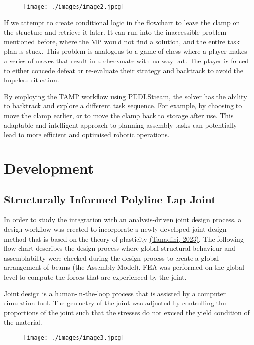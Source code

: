 \begin{figure}[H]
\texttt{[image: ./images/image2.jpeg]}
\end{figure}


If we attempt to create conditional logic in the flowchart to leave the clamp on the structure and retrieve it later. It can run into the inaccessible problem mentioned before, where the MP would not find a solution, and the entire task plan is stuck. This problem is analogous to a game of chess where a player makes a series of moves that result in a checkmate with no way out. The player is forced to either concede defeat or re-evaluate their strategy and backtrack to avoid the hopeless situation.

By employing the TAMP workflow using PDDLStream, the solver has the ability to backtrack and explore a different task sequence. For example, by choosing to move the clamp earlier, or to move the clamp back to storage after use. This adaptable and intelligent approach to planning assembly tasks can potentially lead to more efficient and optimised robotic operations.

\section{Development}

\subsection{Structurally Informed Polyline Lap Joint}

In order to study the integration with an analysis-driven joint design process, a design workflow was created to incorporate a newly developed joint design method that is based on the theory of plasticity \href{https://www.zotero.org/google-docs/?KG0grc}{(Tanadini, 2023)}. The following flow chart describes the design process where global structural behaviour and assemblability were checked during the design process to create a global arrangement of beams (the Assembly Model). FEA was performed on the global level to compute the forces that are experienced by the joint. 

Joint design is a human-in-the-loop process that is assisted by a computer simulation tool. The geometry of the joint was adjusted by controlling the proportions of the joint such that the stresses do not exceed the yield condition of the material.

\begin{figure}[H]
\texttt{[image: ./images/image3.jpeg]}
\end{figure}


